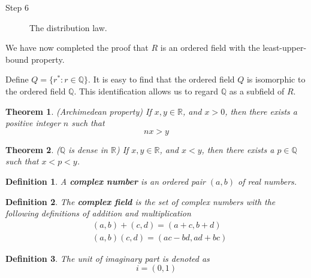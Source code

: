 \documentclass[aps,pra,onecolumn,notitlepage,superscriptaddress]{revtex4-1}
\newcommand{\R}{\mathbb{R}}
\newcommand{\Q}{\mathbb{Q}}
\newtheorem{theo}{Theorem}
\newtheorem{defi}{Definition}
\begin{document}
\begin{framed}
{\begin{description}
            \item[Step 6] The distribution law. 
        \end{description}
        
        We have now completed the proof that $R$ is an ordered field with the least-upper-bound property.

        Define $Q = \{ r^* : r \in \Q \}$. It is easy to find that the ordered field $Q$ is isomorphic to the ordered field $\Q$. This identification allows us to regard $\Q$ as a subfield of $R$.
    }
    \end{framed}

    \begin{theo}
        (Archimedean property) If $x,y \in \R$, and $x > 0$, then there exists a positive integer $n$ such that
        \begin{equation}
            nx > y
        \end{equation}
    \end{theo}
    
    \begin{theo}
        ($\Q$ is dense in $\R$) If $x, y \in \R$, and $x < y$, then there exists a $p \in \Q$ such that $x < p < y$.
    \end{theo}

    \begin{defi}
        A \textbf{complex number} is an ordered pair $(a,b)$ of real numbers.
    \end{defi}
    \begin{defi}
        The \textbf{complex field} is the set of complex numbers with the following definitions of addition and multiplication
        \begin{align*}
            &(a,b) + (c,d) = (a+c, b+d) \\
            &(a,b)(c,d) = (ac-bd, ad+bc)
        \end{align*}
    \end{defi}

    \begin{defi} The unit of imaginary part is denoted as
        \begin{equation}
            i = (0, 1)
        \end{equation}
    \end{defi}
\end{document}
